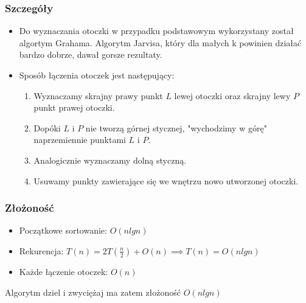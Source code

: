 \documentclass[11pt]{article}
\theoremstyle{remark} \newtheorem{definition}{def.}
\theoremstyle{definition} \newtheorem{twierdzenie}{tw.}
\begin{document}
    \subsubsection{Szczegóły}

    \begin{itemize}
        \item   Do wyznaczania otoczki w przypadku podstawowym wykorzystany został algortym Grahama. Algorytm Jarvisa, który dla małych k powinien działać bardzo dobrze, dawał gorsze rezultaty.
        \item   Sposób łączenia otoczek jest następujący: 
                \begin{enumerate}
                    \item  Wyznaczamy skrajny prawy punkt $L$ lewej otoczki oraz skrajny lewy $P$ punkt prawej otoczki. 
                    \item  Dopóki $L$ i $P$ nie tworzą górnej stycznej, "wychodzimy w górę" naprzemiennie punktami $L$ i $P$.
                    \item  Analogicznie wyznaczamy dolną styczną. 
                    \item  Usuwamy punkty zawierające się we wnętrzu nowo utworzonej otoczki.  
                \end{enumerate}
    \end{itemize}

    \subsubsection{Złożoność}

    \begin{itemize}
        \item Początkowe sortowanie: $O(n lg n)$
        \item Rekurencja: $T(n) = 2 T(\frac{n}{2}) + O(n) \implies T(n) = O(n lg n)$
        \item Każde łączenie otoczek: $O(n)$
    \end{itemize}

    Algorytm dziel i zwyciężaj ma zatem złożoność $O(n lg n)$
\end{document}
